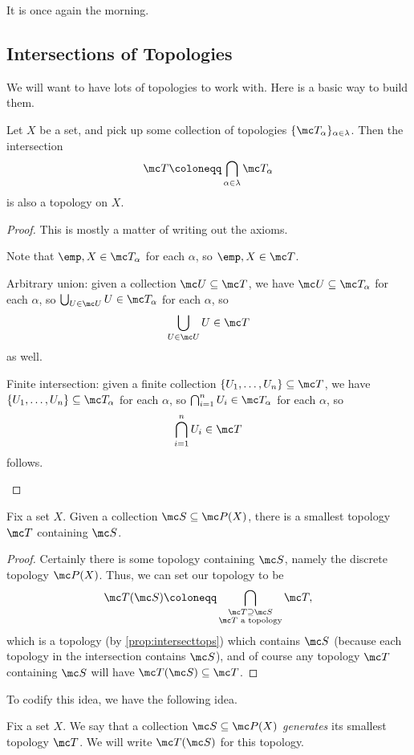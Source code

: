 \documentclass[../notes.tex]{subfiles}
\begin{document}
It is once again the morning.

\subsection{Intersections of Topologies}
We will want to have lots of topologies to work with. Here is a basic way to build them.
\begin{proposition} \label{prop:intersecttops}
	Let $X$ be a set, and pick up some collection of topologies $\{\mc T_\alpha\}_{\alpha\in\lambda}$. Then the intersection
	\[\mc T\coloneqq\bigcap_{\alpha\in\lambda}\mc T_\alpha\]
	is also a topology on $X$.
\end{proposition}
\begin{proof}
	This is mostly a matter of writing out the axioms.
	\begin{listalph}
		\item Note that $\emp,X\in\mc T_\alpha$ for each $\alpha$, so $\emp,X\in\mc T$. 
		\item Arbitrary union: given a collection $\mc U\subseteq\mc T$, we have $\mc U\subseteq\mc T_\alpha$ for each $\alpha$, so $\bigcup_{U\in\mc U}U\in\mc T_\alpha$ for each $\alpha$, so
		\[\bigcup_{U\in\mc U}U\in\mc T\]
		as well.
		\item Finite intersection: given a finite collection $\{U_1,\ldots,U_n\}\subseteq\mc T$, we have $\{U_1,\ldots,U_n\}\subseteq\mc T_\alpha$ for each $\alpha$, so $\bigcap_{i=1}^nU_i\in\mc T_\alpha$ for each $\alpha$, so
		\[\bigcap_{i=1}^nU_i\in\mc T\]
		follows.
		\qedhere
	\end{listalph}
\end{proof}
\begin{corollary}
	Fix a set $X$. Given a collection $\mc S\subseteq\mc P(X)$, there is a smallest topology $\mc T$ containing $\mc S$.
\end{corollary}
\begin{proof}
	Certainly there is some topology containing $\mc S$, namely the discrete topology $\mc P(X)$. Thus, we can set our topology to be
	\[\mc T(\mc S)\coloneqq\bigcap_{\substack{\mc T\supseteq\mc S\\\mc T\text{ a topology}}}\mc T,\]
	which is a topology (by \autoref{prop:intersecttops}) which contains $\mc S$ (because each topology in the intersection contains $\mc S$), and of course any topology $\mc T$ containing $\mc S$ will have $\mc T(\mc S)\subseteq\mc T$.
\end{proof}
To codify this idea, we have the following idea.
\begin{defi}
	Fix a set $X$. We say that a collection $\mc S\subseteq\mc P(X)$ \textit{generates} its smallest topology $\mc T$. We will write $\mc T(\mc S)$ for this topology.
\end{defi}
\end{document}
